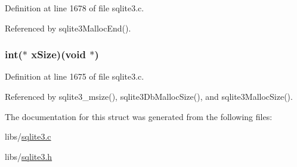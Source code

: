 Definition at line 1678 of file sqlite3.\+c.



Referenced by sqlite3\+Malloc\+End().

\hypertarget{structsqlite3__mem__methods_a37f680cda62590be32b36d962b6ce009}{}
\subsubsection[{x\+Size}]{\setlength{\rightskip}{0pt plus 5cm}int($\ast$ x\+Size)(void $\ast$)}\label{structsqlite3__mem__methods_a37f680cda62590be32b36d962b6ce009}


Definition at line 1675 of file sqlite3.\+c.



Referenced by sqlite3\+\_\+msize(), sqlite3\+Db\+Malloc\+Size(), and sqlite3\+Malloc\+Size().



The documentation for this struct was generated from the following files\+:\begin{DoxyCompactItemize}
\item 
libs/\hyperlink{sqlite3_8c}{sqlite3.\+c}\item 
libs/\hyperlink{sqlite3_8h}{sqlite3.\+h}\end{DoxyCompactItemize}
